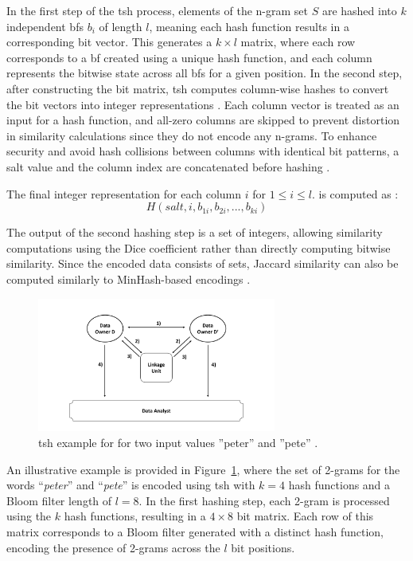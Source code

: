 In the first step of the \ac{tsh} process, elements of the n-gram set \(S\) are hashed into \(k\) independent \ac{bf}s \(b_i\) of length \(l\), meaning each hash function results in a corresponding bit vector.
This generates a \(k \times l\) matrix, where each row corresponds to a \ac{bf} created using a unique hash function, and each column represents the bitwise state across all \ac{bf}s for a given position.
In the second step, after constructing the bit matrix, \ac{tsh} computes column-wise hashes to convert the bit vectors into integer representations .
Each column vector is treated as an input for a hash function, and all-zero columns are skipped to prevent distortion in similarity calculations since they do not encode any n-grams.
To enhance security and avoid hash collisions between columns with identical bit patterns, a salt value and the column index are concatenated before hashing \cite{ranbaduge2020secure}.

The final integer representation for each column $i$ for $1 \leq i \leq l$. is computed as \cite{schaefer2024, ranbaduge2020secure}:
\begin{equation}
    H(salt, i, b_{1i}, b_{2i}, ..., b_{ki})
\end{equation}

The output of the second hashing step is a set of integers, allowing similarity computations using the Dice coefficient rather than directly computing bitwise similarity.
Since the encoded data consists of sets, Jaccard similarity can also be computed similarly to MinHash-based encodings \cite{ranbaduge2020secure}.

\begin{figure}[H]
  \centering
  \includegraphics[width=0.7\textwidth, page=8]{img/visualization.pdf}
  \caption{\ac{tsh} example for for two input values ''peter'' and ''pete'' \cite{ranbaduge2020secure}.}
  \label{fig:tshexample}
\end{figure}

An illustrative example is provided in Figure~\ref{fig:tshexample}, where the set of 2-grams for the words ``\textit{peter}'' and ``\textit{pete}'' is encoded using \ac{tsh} with $k = 4$ hash functions and a Bloom filter length of $l = 8$.
In the first hashing step, each 2-gram is processed using the $k$ hash functions, resulting in a $4 \times 8$ bit matrix.
Each row of this matrix corresponds to a Bloom filter generated with a distinct hash function, encoding the presence of 2-grams across the $l$ bit positions.

